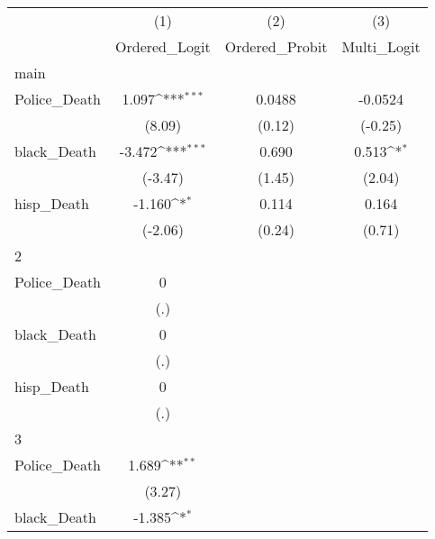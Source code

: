 {
\def\sym#1{\ifmmode^{#1}\else\(^{#1}\)\fi}
\begin{tabular}{l*{3}{c}}
\hline\hline
            &\multicolumn{1}{c}{(1)}&\multicolumn{1}{c}{(2)}&\multicolumn{1}{c}{(3)}\\
            &\multicolumn{1}{c}{Ordered\_Logit}&\multicolumn{1}{c}{Ordered\_Probit}&\multicolumn{1}{c}{Multi\_Logit}\\
\hline
main        &                     &                     &                     \\
Police\_Death&       1.097\sym{***}&      0.0488         &     -0.0524         \\
            &      (8.09)         &      (0.12)         &     (-0.25)         \\
[1em]
black\_Death &      -3.472\sym{***}&       0.690         &       0.513\sym{*}  \\
            &     (-3.47)         &      (1.45)         &      (2.04)         \\
[1em]
hisp\_Death  &      -1.160\sym{*}  &       0.114         &       0.164         \\
            &     (-2.06)         &      (0.24)         &      (0.71)         \\
\hline
2           &                     &                     &                     \\
Police\_Death&           0         &                     &                     \\
            &         (.)         &                     &                     \\
[1em]
black\_Death &           0         &                     &                     \\
            &         (.)         &                     &                     \\
[1em]
hisp\_Death  &           0         &                     &                     \\
            &         (.)         &                     &                     \\
\hline
3           &                     &                     &                     \\
Police\_Death&       1.689\sym{**} &                     &                     \\
            &      (3.27)         &                     &                     \\
[1em]
black\_Death &      -1.385\sym{*}  &                     &                     \\

\end{tabular}}
